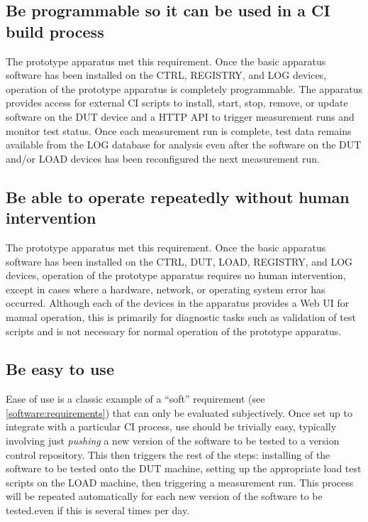 \subsection{Be programmable so it can be used in a CI build process}

The prototype apparatus met this requirement. Once the basic apparatus software has been installed on the CTRL, REGISTRY, and LOG devices, operation of the prototype apparatus is completely programmable. The apparatus provides access for external CI scripts to install, start, stop, remove, or update software on the DUT device and a HTTP API to trigger measurement runs and monitor test status. Once each measurement run is complete, test data remains available from the LOG database for analysis even after the software on the DUT and/or LOAD devices has been reconfigured the next measurement run.

\subsection{Be able to operate repeatedly without human intervention}

The prototype apparatus met this requirement. Once the basic apparatus software has been installed on the CTRL, DUT, LOAD, REGISTRY, and LOG devices, operation of the prototype apparatus requires no human intervention, except in cases where a hardware, network, or operating system error has occurred. Although each of the devices in the apparatus provides a Web UI for manual operation, this is primarily for diagnostic tasks such as validation of test scripts and is not necessary for normal operation of the prototype apparatus.

\subsection{Be easy to use}

Ease of use is a classic example of a \enquote{soft} requirement (see \autoref{software:requirements}) that can only be evaluated subjectively. Once set up to integrate with a particular CI process, use should be trivially easy, typically involving just \emph{pushing} a new version of the software to be tested to a version control repository. This then triggers the rest of the steps: installing of the software to be tested onto the DUT machine, setting up the appropriate load test scripts on the LOAD machine, then triggering a measurement run. This process will be repeated automatically for each new version of the software to be tested.even if this is several times per day.

